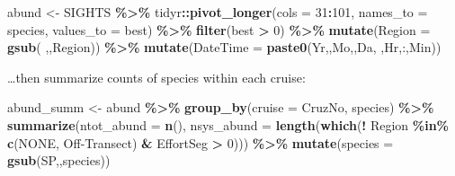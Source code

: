 \documentclass[
]{book}
\newenvironment{Shaded}{\begin{snugshade}}{\end{snugshade}}
\newcommand{\AttributeTok}[1]{\textcolor[rgb]{0.13,0.29,0.53}{#1}}
\newcommand{\DecValTok}[1]{\textcolor[rgb]{0.00,0.00,0.81}{#1}}
\newcommand{\FunctionTok}[1]{\textcolor[rgb]{0.13,0.29,0.53}{\textbf{#1}}}
\newcommand{\NormalTok}[1]{#1}
\newcommand{\OtherTok}[1]{\textcolor[rgb]{0.56,0.35,0.01}{#1}}
\newcommand{\SpecialCharTok}[1]{\textcolor[rgb]{0.81,0.36,0.00}{\textbf{#1}}}
\newcommand{\StringTok}[1]{\textcolor[rgb]{0.31,0.60,0.02}{#1}}
\begin{document}
\begin{Shaded}
\begin{Highlighting}[]
\NormalTok{abund }\OtherTok{\textless{}{-}}
\NormalTok{  SIGHTS }\SpecialCharTok{\%\textgreater{}\%}
\NormalTok{  tidyr}\SpecialCharTok{::}\FunctionTok{pivot\_longer}\NormalTok{(}\AttributeTok{cols =} \DecValTok{31}\SpecialCharTok{:}\DecValTok{101}\NormalTok{,}
                      \AttributeTok{names\_to =} \StringTok{\textquotesingle{}species\textquotesingle{}}\NormalTok{,}
                      \AttributeTok{values\_to =} \StringTok{\textquotesingle{}best\textquotesingle{}}\NormalTok{) }\SpecialCharTok{\%\textgreater{}\%}
  \FunctionTok{filter}\NormalTok{(best }\SpecialCharTok{\textgreater{}} \DecValTok{0}\NormalTok{) }\SpecialCharTok{\%\textgreater{}\%}
  \FunctionTok{mutate}\NormalTok{(}\AttributeTok{Region =} \FunctionTok{gsub}\NormalTok{(}\StringTok{\textquotesingle{} \textquotesingle{}}\NormalTok{,}\StringTok{\textquotesingle{}\textquotesingle{}}\NormalTok{,Region)) }\SpecialCharTok{\%\textgreater{}\%}
  \FunctionTok{mutate}\NormalTok{(}\AttributeTok{DateTime =} \FunctionTok{paste0}\NormalTok{(Yr,}\StringTok{\textquotesingle{}{-}\textquotesingle{}}\NormalTok{,Mo,}\StringTok{\textquotesingle{}{-}\textquotesingle{}}\NormalTok{,Da,}\StringTok{\textquotesingle{} \textquotesingle{}}\NormalTok{,Hr,}\StringTok{\textquotesingle{}:\textquotesingle{}}\NormalTok{,Min))}
\end{Highlighting}
\end{Shaded}

\ldots then summarize counts of species within each cruise:

\begin{Shaded}
\begin{Highlighting}[]
\NormalTok{abund\_summ }\OtherTok{\textless{}{-}}
\NormalTok{  abund }\SpecialCharTok{\%\textgreater{}\%}
  \FunctionTok{group\_by}\NormalTok{(}\AttributeTok{cruise =}\NormalTok{ CruzNo, species) }\SpecialCharTok{\%\textgreater{}\%}
  \FunctionTok{summarize}\NormalTok{(}\AttributeTok{ntot\_abund =} \FunctionTok{n}\NormalTok{(),}
            \AttributeTok{nsys\_abund =} \FunctionTok{length}\NormalTok{(}\FunctionTok{which}\NormalTok{(}\SpecialCharTok{!}\NormalTok{ Region }\SpecialCharTok{\%in\%} \FunctionTok{c}\NormalTok{(}\StringTok{\textquotesingle{}NONE\textquotesingle{}}\NormalTok{, }
                                                      \StringTok{\textquotesingle{}Off{-}Transect\textquotesingle{}}\NormalTok{) }\SpecialCharTok{\&} 
\NormalTok{                                        EffortSeg }\SpecialCharTok{\textgreater{}} \DecValTok{0}\NormalTok{))) }\SpecialCharTok{\%\textgreater{}\%}
  \FunctionTok{mutate}\NormalTok{(}\AttributeTok{species =} \FunctionTok{gsub}\NormalTok{(}\StringTok{\textquotesingle{}SP\textquotesingle{}}\NormalTok{,}\StringTok{\textquotesingle{}\textquotesingle{}}\NormalTok{,species))}
\end{Highlighting}
\end{Shaded}
\end{document}
